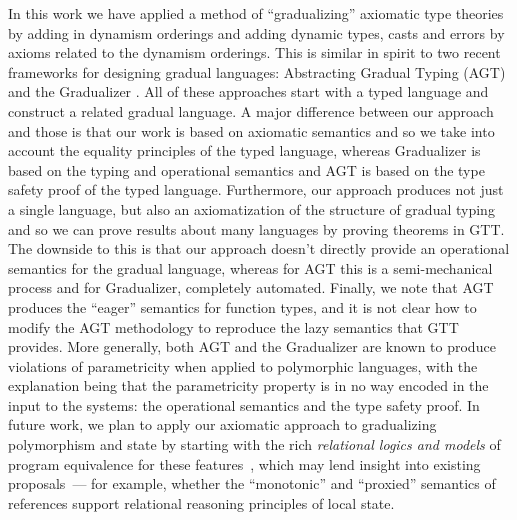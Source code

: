 \documentclass[acmsmall,screen,12pt]{acmart}
\newif\iflong
\begin{document}
{\iflong
\paragraph{Gradual Typing Frameworks}
\fi

In this work we have applied a method of ``gradualizing'' axiomatic
type theories by adding in dynamism orderings and adding dynamic
types, casts and errors by axioms related to the dynamism orderings.
%
This is similar in spirit to two recent frameworks for designing
gradual languages: Abstracting Gradual Typing (AGT) \citep{AGT} and the
Gradualizer \citep{gradualizer16,gradualizer17}.
%
All of these approaches start with a typed language and construct a
related gradual language.
%
A major difference between our approach and those is that our work is
based on axiomatic semantics and so we take into account the equality
principles of the typed language, whereas Gradualizer is based on the
typing and operational semantics and AGT is based on the type safety
proof of the typed language.
%
Furthermore, our approach produces not just a single language, but
also an axiomatization of the structure of gradual typing and so we
can prove results about many languages by proving theorems in GTT.
%
The downside to this is that our approach doesn't directly provide an
operational semantics for the gradual language, whereas for AGT this
is a semi-mechanical process and for Gradualizer, completely
automated.
%
Finally, we note that AGT produces the ``eager'' semantics for
function types, and it is not clear how to modify the AGT methodology
to reproduce the lazy semantics that GTT provides.
%
More generally, both AGT and the Gradualizer are known to produce
violations of parametricity when applied to polymorphic languages,
with the explanation being that the parametricity property is in no
way encoded in the input to the systems: the operational semantics and
the type safety proof.
%
In future work, we plan to apply our axiomatic approach to gradualizing
polymorphism and state by starting with the rich \emph{relational logics
  and models} of program equivalence for these
features~\cite{plotkinabadi93, dunphyphd, ahmed08:paramseal, neis09,
  ahmed09:sdri}, which may lend insight into existing
proposals~\cite{siek15:mono,ahmed17,igarashipoly17,siek-taha06}--- for
example, whether the ``monotonic'' \citep{siek15:mono} and ``proxied''
\citep{siek-taha06} semantics of references support relational reasoning
principles of local state.

}
\end{document}
